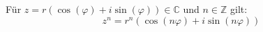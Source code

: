 Für $z = r(\cos(\varphi)+i\sin(\varphi)) \in \mathbb{C}$ und $n \in \mathbb{Z}$ gilt:
$$z^n=r^n(\cos(n\varphi)+i\sin(n\varphi))$$